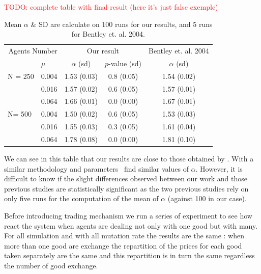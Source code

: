 \documentclass{wscpaperproc}
\newcommand{\memo}[2]{\textcolor{#1}{#2}}
\newcommand{\todo}[1]{\memo{red}{TODO: #1\\}}
\begin{document}
\todo{complete table with final result (here it's just false exemple)}
\begin{table}[h]
	\centering
	\begin{tabular}{ll|ccc}
		\multicolumn{2}{r}{Agents Number}&\multicolumn{2}{c}{Our result}&\multicolumn{1}{c}{Bentley et. al. 2004}\\
			&$\mu$ & $\alpha$ (sd) & $p$-value (sd) &$\alpha$ (sd)\\\hline
		N = 250	&0.004&1.53 (0.03)&0.8 (0.05)&1.54 (0.02)\\
			&0.016&1.57 (0.02)&0.6 (0.05)&1.57 (0.01)\\
			&0.064&1.66 (0.01)&0.0 (0.00)&1.67 (0.01)\\\hline
		N= 500	&0.004&1.50 (0.02)&0.6 (0.05)&1.53 (0.03)\\
			&0.016&1.55 (0.03)&0.3 (0.05)&1.61 (0.04)\\
			&0.064&1.78 (0.08)&0.0 (0.00)&1.81 (0.10)\\
	\end{tabular}
	\caption{Mean $\alpha$ \& SD are calculate on 100 runs for our results, and 5 runs for Bentley et. al. 2004.}
	\label{tab:mualpha}
\end{table}

We can see in this table that our results are close to those obtained by \cite{bentley_random_2004}. With a similar methodology and parameters~\cite{mesoudi_random_2009} find similar values of $\alpha$. However, it is difficult to know if the slight differences observed between our work and those previous studies are statistically significant as the two previous studies rely on only five runs for the computation of the mean of $\alpha$ (against 100 in our case).


Before introducing trading mechanism we run a series of experiment to see how react the system when agents are dealing not only with one good but with many. For all simulation and with all mutation rate the results are the same : when more than one good are exchange the repartition of the prices for each good taken separately are the same and this repartition is in turn the same regardless the number of good exchange. 
\end{document}
